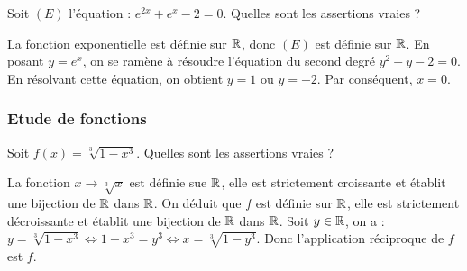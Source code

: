 \begin{question} 
Soit $(E)$ l'équation : $e^{2x}+e^x-2=0$. Quelles sont les assertions vraies ?

\begin{answers}



\end{answers}
\begin{explanations}
La fonction exponentielle est définie sur $\mathbb{R}$, donc $(E)$ est définie sur $\mathbb{R}$. 
En posant $y=e^x$, on se ramène à résoudre l'équation du second degré $y^2+y-2=0$. En résolvant cette équation, on obtient $y=1$ ou $y=-2$. Par conséquent, $x=0$.
\end{explanations}


\end{question}

\subsubsection{Etude de fonctions }
\begin{question} 
Soit $f(x)=\sqrt[3]{1-x^3}$. Quelles sont les assertions vraies ?

\begin{answers}



\end{answers}
\begin{explanations}
La fonction $x\to \sqrt[3]{x}$ est définie sue $\mathbb{R}$, elle est strictement croissante et établit une bijection de $\mathbb{R}$ dans $\mathbb{R}$. On déduit que $f$ est définie sur $\mathbb{R}$, elle est strictement décroissante et établit une bijection de $\mathbb{R}$ dans $\mathbb{R}$. Soit $y\in \mathbb{R}$, on a : $y=\sqrt[3]{1-x^3} \Leftrightarrow 1-x^3=y^3 \Leftrightarrow  x=\sqrt[3]{1-y^3}$. Donc l'application réciproque de $f$ est $f$.
\end{explanations}


\end{question}


